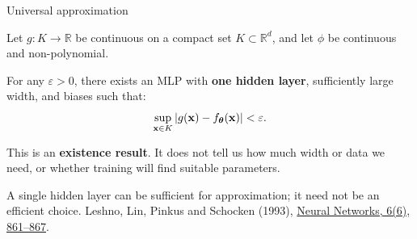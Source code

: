 \documentclass[12pt,aspectratio=169]{beamer}
\begin{document}
\begin{frame}{Universal approximation}
	\setlength{\abovedisplayskip}{6pt}\setlength{\belowdisplayskip}{6pt}
	\begin{tcolorbox}[nndsblue]
		\small
		Let $g:K\to\mathbb{R}$ be continuous on a compact set $K\subset\mathbb{R}^{d}$, and let $\phi$ be continuous and non-polynomial.

		For any $\varepsilon>0$, there exists an MLP with \textbf{one hidden layer}, sufficiently large width, and biases such that:
		\[
			\sup_{\boldsymbol{\mathbf{x}}\in K}\left|g(\boldsymbol{\mathbf{x}})-f_{\boldsymbol{\theta}}(\boldsymbol{\mathbf{x}})\right|<\varepsilon.
		\]
	\end{tcolorbox}
	\small
	This is an \textbf{existence result}. It does not tell us how much width or data we need, or whether training will find suitable parameters.

	A single hidden layer can be sufficient for approximation; it need not be an efficient choice.
	\vfill
	{\scriptsize\color{drawgray}Leshno, Lin, Pinkus and Schocken (1993), \href{https://doi.org/10.1016/S0893-6080(05)80131-5}{Neural Networks, 6(6), 861--867}.}
\end{frame}
\end{document}
